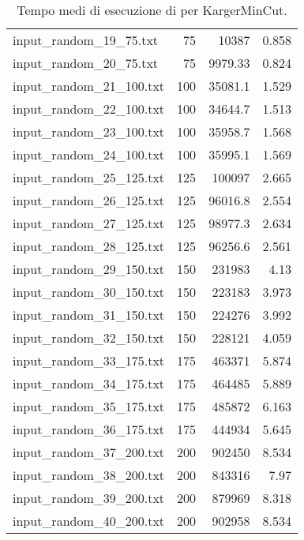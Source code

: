 \begin{table}[H]
\begin{tabular}{lrrr}
     input\_random\_19\_75.txt  &      75 &      10387     &              0.858 \\
     input\_random\_20\_75.txt  &      75 &       9979.33  &              0.824 \\
     input\_random\_21\_100.txt &     100 &      35081.1   &              1.529 \\
     input\_random\_22\_100.txt &     100 &      34644.7   &              1.513 \\
     input\_random\_23\_100.txt &     100 &      35958.7   &              1.568 \\
     input\_random\_24\_100.txt &     100 &      35995.1   &              1.569 \\
     input\_random\_25\_125.txt &     125 &     100097     &              2.665 \\
     input\_random\_26\_125.txt &     125 &      96016.8   &              2.554 \\
     input\_random\_27\_125.txt &     125 &      98977.3   &              2.634 \\
     input\_random\_28\_125.txt &     125 &      96256.6   &              2.561 \\
     input\_random\_29\_150.txt &     150 &     231983     &              4.13  \\
     input\_random\_30\_150.txt &     150 &     223183     &              3.973 \\
     input\_random\_31\_150.txt &     150 &     224276     &              3.992 \\
     input\_random\_32\_150.txt &     150 &     228121     &              4.059 \\
     input\_random\_33\_175.txt &     175 &     463371     &              5.874 \\
     input\_random\_34\_175.txt &     175 &     464485     &              5.889 \\
     input\_random\_35\_175.txt &     175 &     485872     &              6.163 \\
     input\_random\_36\_175.txt &     175 &     444934     &              5.645 \\
     input\_random\_37\_200.txt &     200 &     902450     &              8.534 \\
     input\_random\_38\_200.txt &     200 &     843316     &              7.97  \\
     input\_random\_39\_200.txt &     200 &     879969     &              8.318 \\
     input\_random\_40\_200.txt &     200 &     902958     &              8.534 \\
     \hline
    \end{tabular}

    \caption{Tempo medi di esecuzione di  per KargerMinCut.}
    \label{table:karger-full-contraction}
\end{table}

